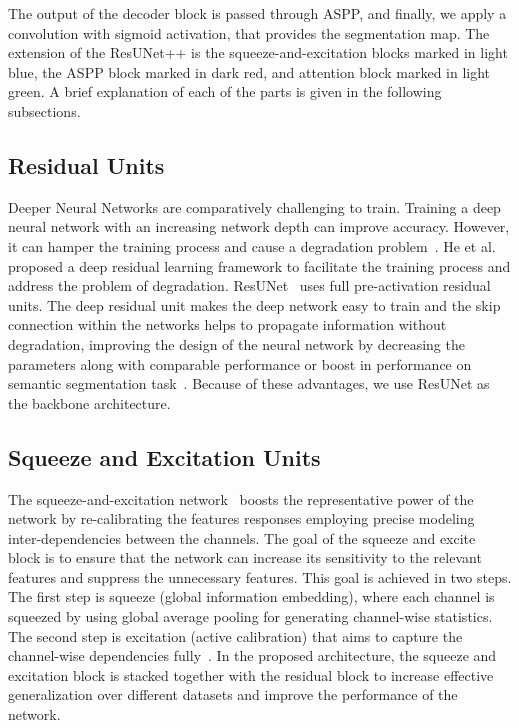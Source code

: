 \documentclass[conference]{IEEEtran}
\newcommand{\resunetplusplus}{ResUNet++\xspace}
\begin{document}
The output of the decoder block is passed through \ac{ASPP}, and finally, we apply a  convolution with sigmoid activation, that provides the segmentation map. The extension of the \resunetplusplus is the squeeze-and-excitation blocks marked in light blue, the \ac{ASPP} block marked in dark red, and attention block marked in light green. A brief explanation of each of the parts is given in the following subsections.


\subsection{Residual Units}
Deeper Neural Networks are comparatively challenging to train. Training a deep neural network with an increasing network depth can improve accuracy. However, it can hamper the training process and cause a degradation problem~\cite{he2016deep,zhang2018road}. He et al.~\cite{he2016deep} proposed a deep residual learning framework to facilitate the training process and address the problem of degradation. ResUNet~\cite{zhang2018road} uses full pre-activation residual units. The deep residual unit makes the deep network easy to train and the skip connection within the networks helps to propagate information without degradation, improving the design of the neural network by decreasing the parameters along with comparable performance or boost in performance on semantic segmentation task~\cite{he2016deep,zhang2018road}. Because of these advantages, we use ResUNet as the backbone architecture.  

\subsection{Squeeze and Excitation Units}
 The squeeze-and-excitation network~\cite{hu2018squeeze} boosts the representative power of the network by re-calibrating the features responses employing precise modeling inter-dependencies between the channels. The goal of the squeeze and excite block is to ensure that the network can increase its sensitivity to the relevant features and suppress the unnecessary features. This goal is achieved in two steps. The first step is squeeze (global information embedding), where each channel is squeezed by using global average pooling for generating channel-wise statistics. The second step is excitation (active calibration) that aims to capture the channel-wise dependencies fully~\cite{hu2018squeeze}. In the proposed architecture, the squeeze and excitation block is stacked together with the residual block to increase effective generalization over different datasets and improve the performance of the network.  
\end{document}
